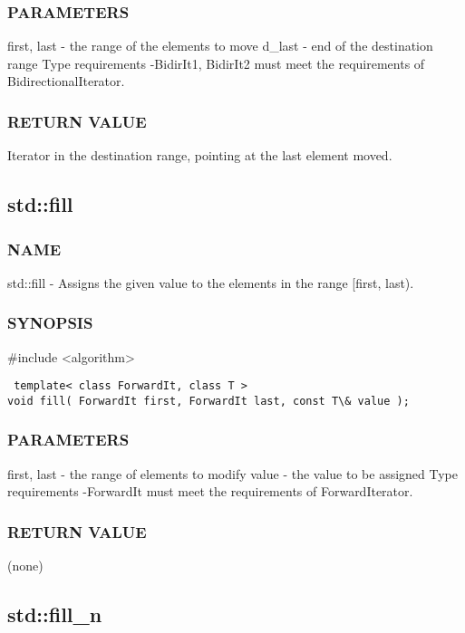 \subsubsection{PARAMETERS}
first, last - the range of the elements to move
d\_last - end of the destination range
 Type requirements
 -BidirIt1, BidirIt2 must meet the requirements of BidirectionalIterator.

\subsubsection{RETURN VALUE}
Iterator in the destination range, pointing at the last element moved.



\subsection{std::fill}

\subsubsection{NAME}
std::fill - Assigns the given value to the elements in the range [first, last).

\subsubsection{SYNOPSIS}
\#include <algorithm>

\begin{lstlisting}
 template< class ForwardIt, class T >
void fill( ForwardIt first, ForwardIt last, const T\& value );
\end{lstlisting}

\subsubsection{PARAMETERS}
first, last - the range of elements to modify
value - the value to be assigned
 Type requirements
 -ForwardIt must meet the requirements of ForwardIterator.

\subsubsection{RETURN VALUE}
(none)



\subsection{std::fill\_n}

